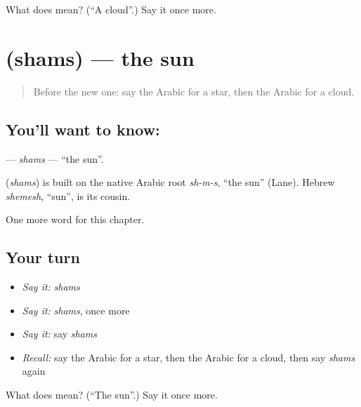 \begin{tcolorbox}[breakable,colback=teal!4,colframe=teal!35!black,title={Before you move on}]
What does  mean? (\textquotedblleft{}A cloud\textquotedblright{}.) Say it once more.
\end{tcolorbox}
\section[\texorpdfstring{\ar{شمس} (shams)}{شمس (shams)}]{ (shams) — the sun}

\label{lesson:AR-C77-shams}



\begin{quote}
Before the new one: say the Arabic for a star, then the Arabic for a cloud.
\end{quote}

\subsection*{You'll want to know: }
\textbf{} — \emph{shams} — \textquotedblleft{}the sun\textquotedblright{}.

\begin{cousinweb}
\textbf{} (\emph{shams}) is built on the native Arabic root \emph{sh-m-s}, \textquotedblleft{}the sun\textquotedblright{} (Lane). Hebrew \emph{shemesh}, \textquotedblleft{}sun\textquotedblright{}, is its cousin.
\end{cousinweb}

\begin{grammarlens}[title={What you've built}]
One more word for this chapter.
\end{grammarlens}

\subsection*{Your turn}
\begin{itemize}
\raggedright
  \item \emph{Say it:} \emph{shams}
  \item \emph{Say it:} \emph{shams}, once more
  \item \emph{Say it:} say \emph{shams}
  \item \emph{Recall:} say the Arabic for a star, then the Arabic for a cloud, then say \emph{shams} again
\end{itemize}

\begin{tcolorbox}[breakable,colback=teal!4,colframe=teal!35!black,title={Before you move on}]
What does  mean? (\textquotedblleft{}The sun\textquotedblright{}.) Say it once more.
\end{tcolorbox}
